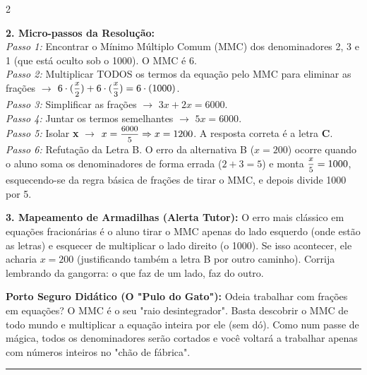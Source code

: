 \begin{multicols*}{2}
\begin{tcolorbox}[colback=CorTitUm!5, colframe=CorTitUm, boxrule=1pt, arc=4pt, left=6pt, right=6pt, top=6pt, bottom=6pt]
    \textbf{2. Micro-passos da Resolução:}\\
    \textit{Passo 1:} Encontrar o Mínimo Múltiplo Comum (MMC) dos denominadores 2, 3 e 1 (que está oculto sob o 1000). O MMC é 6.\\
    \textit{Passo 2:} Multiplicar TODOS os termos da equação pelo MMC para eliminar as frações $\rightarrow$ $6 \cdot (\mfrac{x}{2}) + 6 \cdot (\mfrac{x}{3}) = 6 \cdot (1000)$.\\
    \textit{Passo 3:} Simplificar as frações $\rightarrow$ $3x + 2x = 6000$.\\
    \textit{Passo 4:} Juntar os termos semelhantes $\rightarrow$ $5x = 6000$.\\
    \textit{Passo 5:} Isolar \textbf{x} $\rightarrow$ $x = \mfrac{6000}{5} \Rightarrow x = 1200$. A resposta correta é a letra \textbf{C}.\\
    \textit{Passo 6:} Refutação da Letra B. O erro da alternativa B ($x = 200$) ocorre quando o aluno soma os denominadores de forma errada ($2+3=5$) e monta $\mfrac{x}{5} = 1000$, esquecendo-se da regra básica de frações de tirar o MMC, e depois divide 1000 por 5.\par\vspace{0.1cm}
    
    \textbf{3. Mapeamento de Armadilhas (Alerta Tutor):} O erro mais clássico em equações fracionárias é o aluno tirar o MMC apenas do lado esquerdo (onde estão as letras) e esquecer de multiplicar o lado direito (o 1000). Se isso acontecer, ele acharia $x = 200$ (justificando também a letra B por outro caminho). Corrija lembrando da gangorra: o que faz de um lado, faz do outro.
    \end{tcolorbox}
    \vspace{0.15cm}
    
    \begin{boxexplicacao}
    \textbf{Porto Seguro Didático (O "Pulo do Gato"):} Odeia trabalhar com frações em equações? O MMC é o seu "raio desintegrador". Basta descobrir o MMC de todo mundo e multiplicar a equação inteira por ele (sem dó). Como num passe de mágica, todos os denominadores serão cortados e você voltará a trabalhar apenas com números inteiros no "chão de fábrica".
    \end{boxexplicacao}
\fi

\par\vspace{\espacoQuestao}


\noindent\textcolor{CorLinha}{\rule{\linewidth}{0.5pt}} 
\par\vspace{\espacoPreQuestao}

\end{multicols*}
